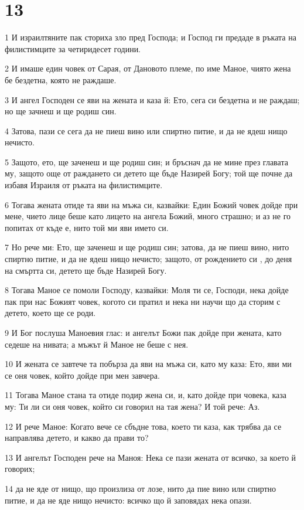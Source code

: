 \chapter{13}

\par 1 И израилтяните пак сториха зло пред Господа; и Господ ги предаде в ръката на филистимците за четиридесет години.
\par 2 И имаше един човек от Сарая, от Дановото племе, по име Маное, чиято жена бе бездетна, която не раждаше.
\par 3 И ангел Господен се яви на жената и каза й: Ето, сега си бездетна и не раждаш; но ще зачнеш и ще родиш син.
\par 4 Затова, пази се сега да не пиеш вино или спиртно питие, и да не ядеш нищо нечисто.
\par 5 Защото, ето, ще заченеш и ще родиш син; и бръснач да не мине през главата му, защото още от раждането си детето ще бъде Назирей Богу; той ще почне да избавя Израиля от ръката на филистимците.
\par 6 Тогава жената отиде та яви на мъжа си, казвайки: Един Божий човек дойде при мене, чието лице беше като лицето на ангела Божий, много страшно; и аз не го попитах от къде е, нито той ми яви името си.
\par 7 Но рече ми: Ето, ще заченеш и ще родиш син; затова, да не пиеш вино, нито спиртно питие, и да не ядеш нищо нечисто; защото, от рождението си , до деня на смъртта си, детето ще бъде Назирей Богу.
\par 8 Тогава Маное се помоли Господу, казвайки: Моля ти се, Господи, нека дойде пак при нас Божият човек, когото си пратил и нека ни научи що да сторим с детето, което ще се роди.
\par 9 И Бог послуша Маноевия глас: и ангелът Божи пак дойде при жената, като седеше на нивата; а мъжът й Маное не беше с нея.
\par 10 И жената се завтече та побърза да яви на мъжа си, като му каза: Ето, яви ми се оня човек, който дойде при мен завчера.
\par 11 Тогава Маное стана та отиде подир жена си, и, като дойде при човека, каза му: Ти ли си оня човек, който си говорил на тая жена? И той рече: Аз.
\par 12 И рече Маное: Когато вече се сбъдне това, което ти каза, как трябва да се направлява детето, и какво да прави то?
\par 13 И ангелът Господен рече на Маноя: Нека се пази жената от всичко, за което й говорих;
\par 14 да не яде от нищо, що произлиза от лозе, нито да пие вино или спиртно питие, и да не яде нищо нечисто: всичко що й заповядах нека опази.
